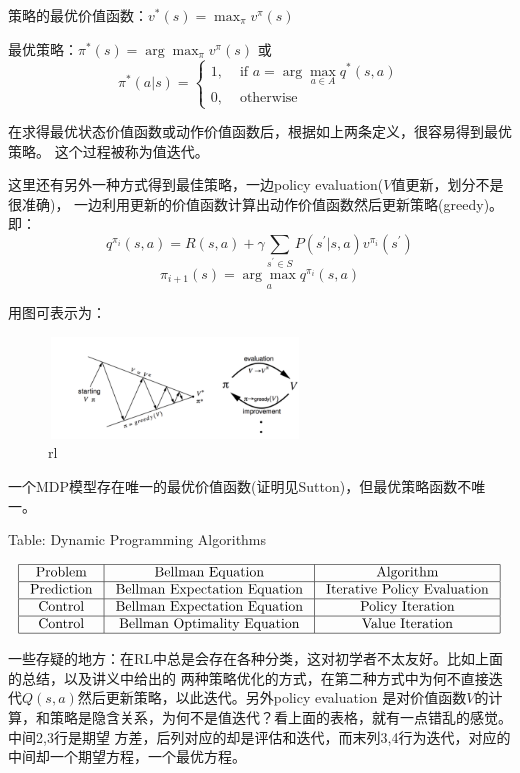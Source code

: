\documentclass[UTF8]{ctexart}
\begin{document}
策略的最优价值函数：$v^{*}(s)=\max _{\pi} v^{\pi}(s)$

最优策略：$\pi^{*}(s)=\arg \max _{\pi} v^{\pi}(s)$
或
$$\pi^{*}(a | s)=\left\{\begin{array}{ll}
    1, & \text { if } a=\arg \max _{a \in A} q^{*}(s, a) \\
    0, & \text { otherwise }
    \end{array}\right.$$

在求得最优状态价值函数或动作价值函数后，根据如上两条定义，很容易得到最优策略。
这个过程被称为值迭代。

这里还有另外一种方式得到最佳策略，一边policy evaluation($V$值更新，划分不是很准确)，
一边利用更新的价值函数计算出动作价值函数然后更新策略(greedy)。
即：
$$q^{\pi_{i}}(s, a)=R(s, a)+\gamma \sum_{s^{\prime} \in S} P\left(s^{\prime} | s,
a\right) v^{\pi_{i}}\left(s^{\prime}\right)$$
$$\pi_{i+1}(s)=\underset{a}{\arg \max } q^{\pi_{i}}(s, a)$$

用图可表示为：
\begin{figure}[htbp]
	\centering
	\includegraphics[width=6.7cm, height=2.7cm]{./pic/evalimp.png}
	\caption{rl}
\end{figure}

一个MDP模型存在唯一的最优价值函数(证明见Sutton)，但最优策略函数不唯一。


\begin{center}
    Table: Dynamic Programming Algorithms
\end{center}
$$\begin{array}{|c|c|c|}
    \hline \text { Problem } & \text { Bellman Equation } & \text { Algorithm } \\
    \hline \text { Prediction } & \text { Bellman Expectation Equation } & \text { Iterative Policy Evaluation } \\
    \hline \text { Control } & \text { Bellman Expectation Equation } & \text { Policy Iteration } \\
    \hline \text { Control } & \text { Bellman Optimality Equation } & \text { Value Iteration } \\
    \hline
    \end{array}$$

一些存疑的地方：在RL中总是会存在各种分类，这对初学者不太友好。比如上面的总结，以及讲义中给出的
两种策略优化的方式，在第二种方式中为何不直接迭代$Q(s,a)$然后更新策略，以此迭代。另外policy evaluation
是对价值函数$V$的计算，和策略是隐含关系，为何不是值迭代？看上面的表格，就有一点错乱的感觉。中间2,3行是期望
方差，后列对应的却是评估和迭代，而末列3,4行为迭代，对应的中间却一个期望方程，一个最优方程。
\end{document}

